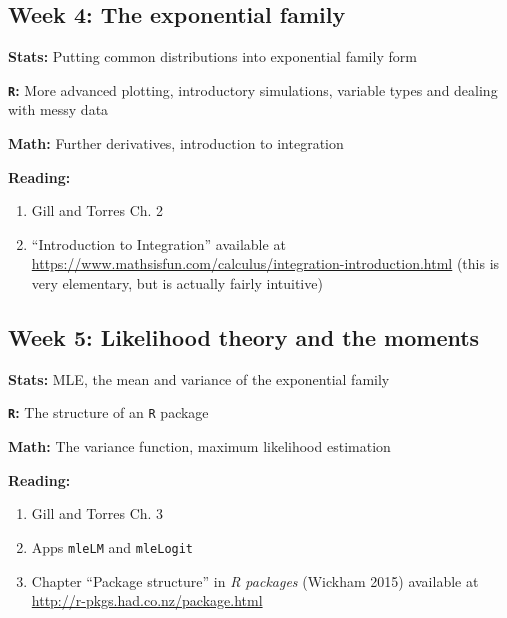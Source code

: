 \documentclass[12pt]{article}
\begin{document}
\subsection*{Week 4: The exponential family}

\noindent \textbf{Stats:} Putting common distributions into exponential family form

\noindent \textbf{\texttt{R}:} More advanced plotting, introductory simulations, variable types and dealing with messy data

\noindent \textbf{Math:} Further derivatives, introduction to integration

\noindent \textbf{Reading:}

\begin{enumerate}[1)]

\item Gill and Torres Ch. 2

\item ``Introduction to Integration'' available at \href{https://www.mathsisfun.com/calculus/integration-introduction.html}{https://www.mathsisfun.com/calculus/integration-introduction.html} (this is very elementary, but is actually fairly intuitive)

\end{enumerate}

\subsection*{Week 5: Likelihood theory and the moments}

\noindent \textbf{Stats:} MLE, the mean and variance of the exponential family

\noindent \textbf{\texttt{R}:} The structure of an \texttt{R} package

\noindent \textbf{Math:} The variance function, maximum likelihood estimation

\noindent \textbf{Reading:}

\begin{enumerate}[1)]

\item Gill and Torres Ch. 3

\item Apps \texttt{mleLM} and \texttt{mleLogit}

\item Chapter ``Package structure'' in \emph{R packages} (Wickham 2015) available at \href{http://r-pkgs.had.co.nz/package.html}{http://r-pkgs.had.co.nz/package.html}

\end{enumerate}
\end{document}
